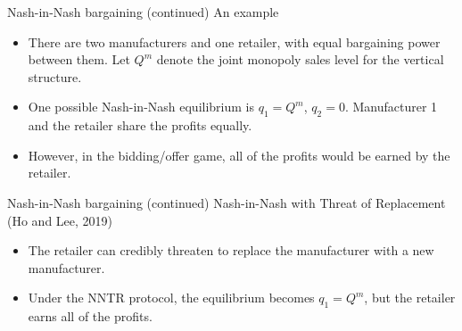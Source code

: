 \documentclass[aspectratio=169]{beamer}  %
\begin{document}
\begin{frame}{Nash-in-Nash bargaining (continued)}
    An example \vspace{.2cm}
    \begin{itemize}
        \item There are two manufacturers and one retailer, with equal bargaining power between them. Let $Q^m$ denote the joint monopoly sales level for the vertical structure. \vspace{.2cm}
        \item One possible Nash-in-Nash equilibrium is $q_1 = Q^m$, $q_2 = 0$. Manufacturer 1 and the retailer share the profits equally. \vspace{.2cm}
        \item However, in the bidding/offer game, all of the profits would be earned by the retailer. \vspace{.2cm}
    \end{itemize}
\end{frame}



\begin{frame}{Nash-in-Nash bargaining (continued)}
    Nash-in-Nash with Threat of Replacement (Ho and Lee, 2019) \vspace{.2cm}
    \begin{itemize}
        \item The retailer can credibly threaten to replace the manufacturer with a new manufacturer. \vspace{.2cm} 
        \item Under the NNTR protocol, the equilibrium becomes $q_1 = Q^m$, but the retailer earns all of the profits. \vspace{.2cm}
    \end{itemize}
\end{frame}
\end{document}
